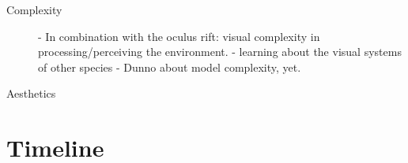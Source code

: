 \documentclass{acm_proc_article-sp}
\begin{document}
\begin{description}
\item[Complexity]
- In combination with the oculus rift: visual complexity in
  processing/perceiving the environment.
- learning about the visual systems of other species
- Dunno about model complexity, yet.

\item[Aesthetics]
\end{description}

\section{Timeline}

\printbibliography

\balancecolumns
\end{document}
